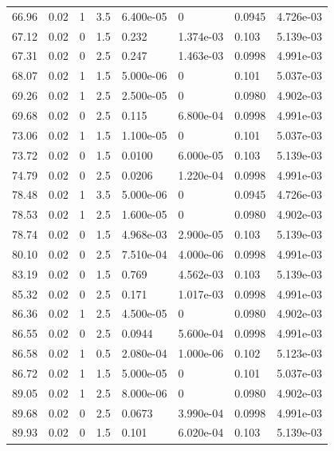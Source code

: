 \documentclass[preview]{standalone}
\begin{document}
{{{\begin{tabular}{L{1.2cm}C{1.2cm} C{0.3cm}C{0.5cm} C{1.4cm}C{1.4cm} C{1.4cm}C{1.4cm}}
  66.96  &  0.02  & 1     & 3.5 &  6.400e-05  & 0  & 0.0945 &  4.726e-03   \\ 
  67.12  &  0.02  & 0     & 1.5 &  0.232  & 1.374e-03  & 0.103 &  5.139e-03   \\ 
  67.31  &  0.02  & 0     & 2.5 &  0.247  & 1.463e-03  & 0.0998 &  4.991e-03   \\ 
  68.07  &  0.02  & 1     & 1.5 &  5.000e-06  & 0  & 0.101 &  5.037e-03   \\ 
  69.26  &  0.02  & 1     & 2.5 &  2.500e-05  & 0  & 0.0980 &  4.902e-03   \\ 
  69.68  &  0.02  & 0     & 2.5 &  0.115  & 6.800e-04  & 0.0998 &  4.991e-03   \\ 
  73.06  &  0.02  & 1     & 1.5 &  1.100e-05  & 0  & 0.101 &  5.037e-03   \\ 
  73.72  &  0.02  & 0     & 1.5 &  0.0100  & 6.000e-05  & 0.103 &  5.139e-03   \\ 
  74.79  &  0.02  & 0     & 2.5 &  0.0206  & 1.220e-04  & 0.0998 &  4.991e-03   \\ 
  78.48  &  0.02  & 1     & 3.5 &  5.000e-06  & 0  & 0.0945 &  4.726e-03   \\ 
  78.53  &  0.02  & 1     & 2.5 &  1.600e-05  & 0  & 0.0980 &  4.902e-03   \\ 
  78.74  &  0.02  & 0     & 1.5 &  4.968e-03  & 2.900e-05  & 0.103 &  5.139e-03   \\ 
  80.10  &  0.02  & 0     & 2.5 &  7.510e-04  & 4.000e-06  & 0.0998 &  4.991e-03   \\ 
  83.19  &  0.02  & 0     & 1.5 &  0.769  & 4.562e-03  & 0.103 &  5.139e-03   \\ 
  85.32  &  0.02  & 0     & 2.5 &  0.171  & 1.017e-03  & 0.0998 &  4.991e-03   \\ 
  86.36  &  0.02  & 1     & 2.5 &  4.500e-05  & 0  & 0.0980 &  4.902e-03   \\ 
  86.55  &  0.02  & 0     & 2.5 &  0.0944  & 5.600e-04  & 0.0998 &  4.991e-03   \\ 
  86.58  &  0.02  & 1     & 0.5 &  2.080e-04  & 1.000e-06  & 0.102 &  5.123e-03   \\ 
  86.72  &  0.02  & 1     & 1.5 &  5.000e-05  & 0  & 0.101 &  5.037e-03   \\ 
  89.05  &  0.02  & 1     & 2.5 &  8.000e-06  & 0  & 0.0980 &  4.902e-03   \\ 
  89.68  &  0.02  & 0     & 2.5 &  0.0673  & 3.990e-04  & 0.0998 &  4.991e-03   \\ 
  89.93  &  0.02  & 0     & 1.5 &  0.101  & 6.020e-04  & 0.103 &  5.139e-03   \\ 

\end{tabular}}}}
\end{document}
